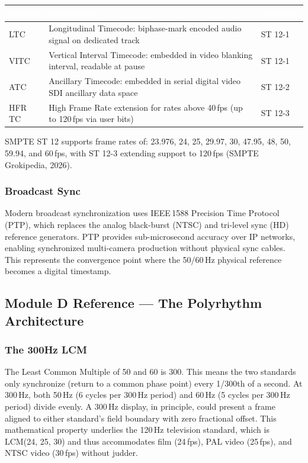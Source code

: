 \documentclass[11pt,letterpaper]{article}
\newcommand{\tableheader}[1]{\textbf{\sffamily\textcolor{white}{#1}}}
\begin{document}
\begin{center}
\begin{tabularx}{\textwidth}{L{2.5cm}XC{2cm}}
\toprule
{}
\tableheader{Format} & \tableheader{Description} & \tableheader{Standard} \\
\midrule
LTC & Longitudinal Timecode: biphase-mark encoded audio signal on dedicated track & ST 12-1 \\
VITC & Vertical Interval Timecode: embedded in video blanking interval, readable at pause & ST 12-1 \\
ATC & Ancillary Timecode: embedded in serial digital video SDI ancillary data space & ST 12-2 \\
HFR TC & High Frame Rate extension for rates above 40\,fps (up to 120\,fps via user bits) & ST 12-3 \\
\bottomrule
\end{tabularx}
\end{center}

SMPTE ST 12 supports frame rates of: 23.976, 24, 25, 29.97, 30, 47.95, 48, 50, 59.94, and 60\,fps,
with ST 12-3 extending support to 120\,fps (SMPTE Grokipedia, 2026).

\subsubsection{Broadcast Sync}

Modern broadcast synchronization uses IEEE\,1588 Precision Time Protocol (PTP), which replaces the
analog black-burst (NTSC) and tri-level sync (HD) reference generators. PTP provides sub-microsecond
accuracy over IP networks, enabling synchronized multi-camera production without physical sync cables.
This represents the convergence point where the 50/60\,Hz physical reference becomes a digital
timestamp.

\subsection{Module D Reference --- The Polyrhythm Architecture}

\subsubsection{The 300Hz LCM}

The Least Common Multiple of 50 and 60 is 300. This means the two standards only synchronize
(return to a common phase point) every 1/300th of a second. At 300\,Hz, both 50\,Hz (6 cycles per
300\,Hz period) and 60\,Hz (5 cycles per 300\,Hz period) divide evenly. A 300\,Hz display, in
principle, could present a frame aligned to either standard's field boundary with zero fractional
offset. This mathematical property underlies the 120\,Hz television standard, which is LCM(24, 25, 30)
and thus accommodates film (24\,fps), PAL video (25\,fps), and NTSC video (30\,fps) without judder.
\end{document}
